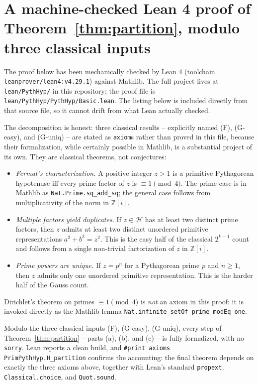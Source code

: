 \documentclass{article}
\theoremstyle{plain}
\theoremstyle{definition}
\theoremstyle{remark}
\begin{document}
\newpage
\appendix
\section{A machine-checked Lean 4 proof of Theorem~\ref{thm:partition},
modulo three classical inputs}

The proof below has been mechanically checked by Lean 4
(toolchain \verb|leanprover/lean4:v4.29.1|) against Mathlib.
The full project lives at \verb|lean/PythHyp/| in this repository; the proof
file is\\\verb|lean/PythHyp/PythHyp/Basic.lean|.
The listing below is included directly from that source file, so it cannot
drift from what Lean actually checked.

The decomposition is honest: three classical results -- explicitly named
(F), (G-easy), and (G-uniq) -- are stated as \verb|axiom|s rather than
proved in this file, because their formalization, while certainly
possible in Mathlib, is a substantial project of its own. They are
classical theorems, not conjectures:
\begin{itemize}
  \item[(F)] {\em Fermat's characterization.\/} A positive integer $z > 1$
    is a primitive Pythagorean hypotenuse iff every prime factor of $z$ is
    $\equiv 1 \pmod 4$. The prime case is in Mathlib as
    \verb|Nat.Prime.sq_add_sq|; the general case follows from
    multiplicativity of the norm in $\mathbb Z[i]$.
  \item[(G-easy)] {\em Multiple factors yield duplicates.\/} If $z \in
    \mathcal H$ has at least two distinct prime factors, then $z$ admits
    at least two distinct unordered primitive representations
    $a^2 + b^2 = z^2$. This is the easy half of the classical
    $2^{k-1}$ count and follows from a single non-trivial
    factorization of $z$ in $\mathbb Z[i]$.
  \item[(G-uniq)] {\em Prime powers are unique.\/} If $z = p^n$ for a
    Pythagorean prime $p$ and $n \ge 1$, then $z$ admits only one
    unordered primitive representation. This is the harder half of the
    Gauss count.
\end{itemize}
Dirichlet's theorem on primes $\equiv 1 \pmod 4$ is {\em not\/} an axiom
in this proof: it is invoked directly as the Mathlib lemma
\verb|Nat.infinite_setOf_prime_modEq_one|.

Modulo the three classical inputs (F), (G-easy), (G-uniq), every step
of Theorem~\ref{thm:partition} -- parts (a), (b), and (c) -- is fully
formalized, with no \verb|sorry|. Lean reports a clean build, and
\verb|#print axioms PrimPythHyp.H_partition| confirms the accounting: the
final theorem depends on exactly the three axioms above, together with
Lean's standard \verb|propext|, \verb|Classical.choice|, and
\verb|Quot.sound|.
\end{document}
